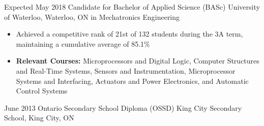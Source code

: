 \documentclass[hidelinks]{kkurucz-cv}
\begin{document}
\begin{entrylist}
\entry
{Expected May 2018}
{Candidate for Bachelor of Applied Science (BASc)}
{University of Waterloo, Waterloo, ON}
{{\headingfont in Mechatronics Engineering}}
{
\begin{itemize}
\item Achieved a competitive rank of 21st of 132 students during the 3A term, maintaining a cumulative average of 85.1\%
\item \textbf{Relevant Courses:}  Microprocessors and Digital Logic, Computer Structures and Real-Time Systems, Sensors and Instrumentation, Microprocessor Systems and Interfacing, Actuators and Power Electronics, and Automatic Control Systems
\end{itemize}
}
\entry
{June 2013}
{Ontario Secondary School Diploma (OSSD)}
{King City Secondary School, King City, ON}
{\null}
{\null}
\end{entrylist}
\end{document}
